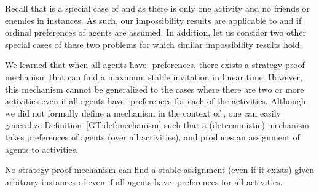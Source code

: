 Recall that \AOIPs is a special case of \GASPs and \SIPs as there is only one activity and no friends or enemies in \AOIPs instances. As such, our impossibility results are applicable to \GASPs and \SIPs if ordinal preferences of agents are assumed. In addition, let us consider two other special cases of these two problems for which similar impossibility results hold.

We learned that when all agents have \INC-preferences, there exists a strategy-proof mechanism that can find a maximum stable invitation in linear time. However, this mechanism cannot be generalized to the cases where there are two or more activities even if all agents have \INC-preferences for each of the activities. Although we did not formally define a mechanism in the context of \GASP, one can easily generalize Definition~\ref{GT:def:mechanism} such that a (deterministic) mechanism takes preferences of agents (over all activities), and produces an assignment of agents to activities. 
\begin{theorem} \label{GT:thm:impossibility_inc_gasp}
No strategy-proof mechanism can find a stable assignment (even if it exists) given arbitrary instances of \GASPs even if all agents have \INC-preferences for all activities. 
\end{theorem}
